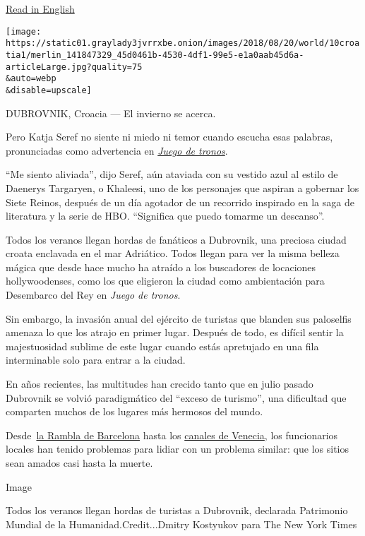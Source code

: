 \href{https://www.nytimes3xbfgragh.onion/2018/08/19/world/europe/dubrovnik-croatia-game-of-thrones.html}{Read
in English}

\texttt{[image: https://static01.graylady3jvrrxbe.onion/images/2018/08/20/world/10croatia1/merlin\_141847329\_45d0461b-4530-4df1-99e5-e1a0aab45d6a-articleLarge.jpg?quality=75\\\&auto=webp\\\&disable=upscale]}

DUBROVNIK, Croacia --- El invierno se acerca.

Pero Katja Seref no siente ni miedo ni temor cuando escucha esas
palabras, pronunciadas como advertencia en
\href{https://www.nytimes3xbfgragh.onion/es/tag/game-of-thrones/}{\emph{Juego
de tronos}}.

``Me siento aliviada'', dijo Seref, aún ataviada con su vestido azul al
estilo de Daenerys Targaryen, o Khaleesi, uno de los personajes que
aspiran a gobernar los Siete Reinos, después de un día agotador de un
recorrido inspirado en la saga de literatura y la serie de HBO.
``Significa que puedo tomarme un descanso''.

Todos los veranos llegan hordas de fanáticos a Dubrovnik, una preciosa
ciudad croata enclavada en el mar Adriático. Todos llegan para ver la
misma belleza mágica que desde hace mucho ha atraído a los buscadores de
locaciones hollywoodenses, como los que eligieron la ciudad como
ambientación para Desembarco del Rey en \emph{Juego de tronos}.

Sin embargo, la invasión anual del ejército de turistas que blanden sus
paloselfis amenaza lo que los atrajo en primer lugar. Después de todo,
es difícil sentir la majestuosidad sublime de este lugar cuando estás
apretujado en una fila interminable solo para entrar a la ciudad.

En años recientes, las multitudes han crecido tanto que en julio pasado
Dubrovnik se volvió paradigmático del ``exceso de turismo'', una
dificultad que comparten muchos de los lugares más hermosos del mundo.

Desde~\href{https://www.nytimes3xbfgragh.onion/es/2017/08/14/la-posverdad-de-la-turismofobia/}{la
Rambla de Barcelona} hasta los
\href{https://www.nytimes3xbfgragh.onion/es/2017/08/06/venecia-corre-el-riesgo-de-convertirse-en-la-disneylandia-sobre-el-mar/}{canales
de Venecia}, los funcionarios locales han tenido problemas para lidiar
con un problema similar: que los sitios sean amados casi hasta la
muerte.

Image

Todos los veranos llegan hordas de turistas a Dubrovnik, declarada
Patrimonio Mundial de la Humanidad.Credit...Dmitry Kostyukov para The
New York Times

